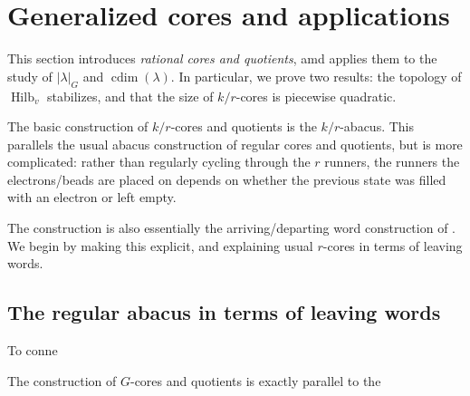 \documentclass{amsart}[12pt]
\theoremstyle{definition}
\DeclareMathOperator{\Hilb}{Hilb}
\DeclareMathOperator{\cdim}{cdim}
\begin{document}
 


\section{Generalized cores and applications}

This section introduces \emph{rational cores and quotients}, amd applies them to the study of $|\lambda|_G$ and $\cdim(\lambda)$.  In particular, we prove two results: the topology of $\Hilb_v$ stabilizes, and that the size of $k/r$-cores is piecewise quadratic.

The basic construction of $k/r$-cores and quotients is the $k/r$-abacus.  This parallels the usual abacus construction of regular cores and quotients, but is more complicated: rather than regularly cycling through the $r$ runners, the runners the electrons/beads are placed on depends on whether the previous state was filled with an electron or left empty.  

The construction is also essentially the arriving/departing word construction of \cite{LW}.  We begin by making this explicit, and explaining usual $r$-cores in terms of leaving words.


\subsection{The regular abacus in terms of leaving words} \label{sec:leaving-words}

To conne




The construction of $G$-cores and quotients is exactly parallel to the 
\end{document}
